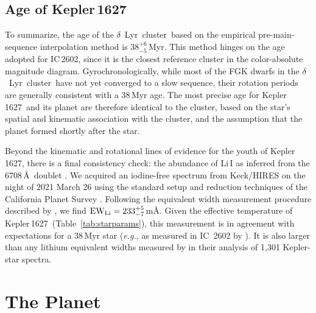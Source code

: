 \documentclass[12pt,modern,twocolumn,tighten]{aastex63}
\newcommand{\cn}{$\delta$\ Lyr\ cluster} %
\newcommand{\sn}{Kepler\,1627} %
\newcommand{\clusterage}{$38^{+6}_{-5}$\,Myr} %
\begin{document}
\subsection{Age of Kepler\,1627}

To summarize, the age of the \cn\ based on the empirical
pre-main-sequence interpolation method is \clusterage.  This method
hinges on the age adopted for IC\,2602, since it is the closest
reference cluster in the color-absolute magnitude diagram.
Gyrochronologically, while most of the FGK dwarfs in the \cn\ have not
yet converged to a slow sequence, their rotation periods are generally
consistent with a 38\,Myr age. The most precise age for \sn\ and its
planet are therefore identical to the cluster, based on the star's
spatial and kinematic association with the cluster, and the assumption
that the planet formed shortly after the star.

Beyond the kinematic and rotational lines of evidence for the youth of
\sn, there is a final consistency check: the abundance of
Li\,\textsc{I} as inferred from the 6708\,\AA\ doublet \citep[{\it
e.g.},][]{soderblom_ages_2014}.  We acquired an iodine-free spectrum
from Keck/HIRES on the night of 2021 March 26 using the standard setup
and reduction techniques of the California Planet Survey
\citep{howard_cps_2010}.  Following the equivalent width measurement
procedure described by \citet{bouma_2021_ngc2516}, we find ${\rm
EW}_{\rm Li} = 233^{+5}_{-7}$\,m\AA.   %
Given the effective temperature of \sn\ (Table~\ref{tab:starparams}),
this measurement is in agreement with expectations for a 38\,Myr star
({\it e.g.}, as measured in IC~2602 by
\citealt{randich_gaiaeso_2018}).  It is also larger than any
lithium equivalent widths measured by \citet{berger_identifying_2018}
in their analysis of 1{,}301 Kepler-star spectra.


\section{The Planet}
\label{sec:planet}
\end{document}
